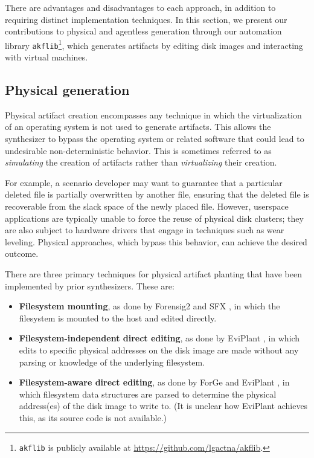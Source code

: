 \documentclass[final,5p,times,twocolumn]{elsarticle}
\newcommand{\passthrough}[1]{#1}
\begin{document}
There are advantages and disadvantages to each approach, in addition to
requiring distinct implementation techniques. In this section, we
present our contributions to physical and agentless generation through
our automation library \passthrough{\lstinline!akflib!}\footnote{\passthrough{\lstinline!akflib!}
  is publicly available at \url{https://github.com/lgactna/akflib}.},
which generates artifacts by editing disk images and interacting with
virtual machines.

\subsection{Physical generation}\label{physical-generation}

Physical artifact creation encompasses any technique in which the
virtualization of an operating system is not used to generate artifacts.
This allows the synthesizer to bypass the operating system or related
software that could lead to undesirable non-deterministic behavior. This
is sometimes referred to as \emph{simulating} the creation of artifacts
rather than \emph{virtualizing} their creation.

For example, a scenario developer may want to guarantee that a
particular deleted file is partially overwritten by another file,
ensuring that the deleted file is recoverable from the slack space of
the newly placed file. However, userspace applications are typically
unable to force the reuse of physical disk clusters; they are also
subject to hardware drivers that engage in techniques such as wear
leveling. Physical approaches, which bypass this behavior, can achieve
the desired outcome.

There are three primary techniques for physical artifact planting that
have been implemented by prior synthesizers. These are:

\begin{itemize}
\item
  \textbf{Filesystem mounting}, as done by Forensig2
  \citep{mochForensicImageGenerator2009} and SFX
  \citep{russellForensicImageDescription2012}, in which the
  filesystem is mounted to the host and edited directly.
\item
  \textbf{Filesystem-independent direct editing}, as done by EviPlant
  \citep{scanlonEviPlantEfficientDigital2017}, in which edits to
  specific physical addresses on the disk image are made without any
  parsing or knowledge of the underlying filesystem.
\item
  \textbf{Filesystem-aware direct editing}, as done by ForGe
  \citep{vistiAutomaticCreationComputer2015} and EviPlant
  \citep{scanlonEviPlantEfficientDigital2017}, in which filesystem
  data structures are parsed to determine the physical address(es) of
  the disk image to write to. (It is unclear how EviPlant achieves this,
  as its source code is not available.)
\end{itemize}
\end{document}
